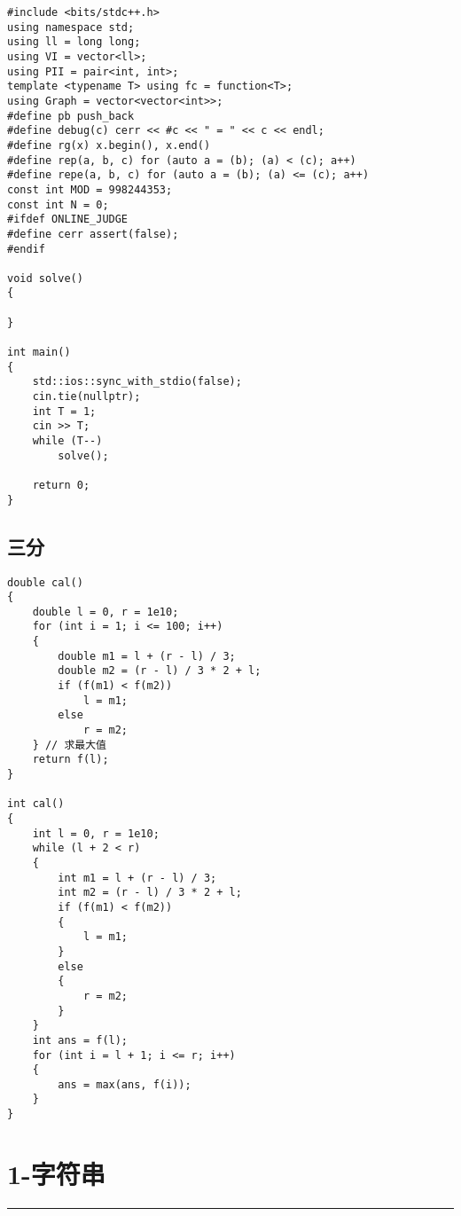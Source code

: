 \documentclass[]{article}
\begin{document}
\begin{verbatim}
#include <bits/stdc++.h>
using namespace std;
using ll = long long;
using VI = vector<ll>;
using PII = pair<int, int>;
template <typename T> using fc = function<T>;
using Graph = vector<vector<int>>;
#define pb push_back
#define debug(c) cerr << #c << " = " << c << endl;
#define rg(x) x.begin(), x.end()
#define rep(a, b, c) for (auto a = (b); (a) < (c); a++)
#define repe(a, b, c) for (auto a = (b); (a) <= (c); a++)
const int MOD = 998244353;
const int N = 0;
#ifdef ONLINE_JUDGE
#define cerr assert(false);
#endif

void solve()
{
    
}

int main()
{
    std::ios::sync_with_stdio(false);
    cin.tie(nullptr);
    int T = 1;
    cin >> T;
    while (T--)
        solve();

    return 0;
}
\end{verbatim}

\hypertarget{ux4e09ux5206}{%
\subsection{三分}\label{ux4e09ux5206}}

\begin{verbatim}
double cal()
{
    double l = 0, r = 1e10;
    for (int i = 1; i <= 100; i++)
    {
        double m1 = l + (r - l) / 3;
        double m2 = (r - l) / 3 * 2 + l;
        if (f(m1) < f(m2))
            l = m1;
        else
            r = m2;
    } // 求最大值
    return f(l);
}

int cal()
{
    int l = 0, r = 1e10;
    while (l + 2 < r)
    {
        int m1 = l + (r - l) / 3;
        int m2 = (r - l) / 3 * 2 + l;
        if (f(m1) < f(m2))
        {
            l = m1;
        }
        else
        {
            r = m2;
        }
    }
    int ans = f(l);
    for (int i = l + 1; i <= r; i++)
    {
        ans = max(ans, f(i));
    }
}
\end{verbatim}

\hypertarget{ux5b57ux7b26ux4e32}{%
\section{1-字符串}\label{ux5b57ux7b26ux4e32}}

\begin{center}\rule{0.5\linewidth}{0.5pt}\end{center}
\end{document}
